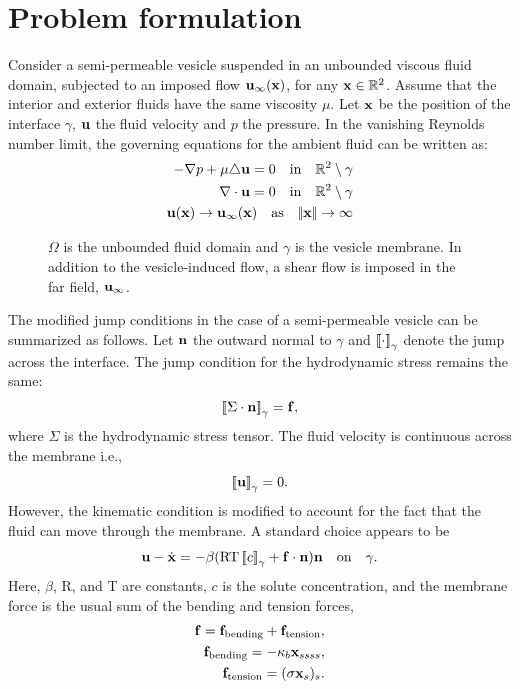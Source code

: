 \documentclass[twoside,twocolumn,9pt]{article}
\begin{document}
\section{Problem formulation} \label{sc:formulate}
Consider a semi-permeable vesicle suspended in an unbounded viscous
fluid domain, subjected to an imposed flow $\mathbf{u}_\infty(\mathbf{x})$, for any
$\mathbf{x} \in \mathbb{R}^2$.  Assume that the interior and exterior fluids have the same viscosity $\mu$. Let $\mathbf{x}$ be the position of the interface $\gamma$, $\mathbf{u}$ the fluid velocity and $p$ the pressure. In the vanishing Reynolds number limit, the governing equations for the ambient fluid can be written as: 
%
\begin{subequations}
\begin{align}
-\nabla p + \mu \triangle \mbu = 0 \quad\text{in}\quad
  \RR^2\setminus\gamma  &  \\
% 
\nabla \cdot \mbu = 0  \quad\text{in}\quad \RR^2\setminus\gamma &\\
%
\mbu(\mbx) \rightarrow \mbu_\infty(\mbx) \quad \text{as} \quad  \norm{\mbx} \rightarrow \infty & 
 \end{align} \label{eqn:governing}
\end{subequations}
\begin{figure}[H]
	\centering
	\caption{$\Omega$ is the unbounded fluid domain and $\gamma$ is the vesicle membrane. In addition to the vesicle-induced flow, a shear flow is imposed in the far field, $\mathbf{u}_\infty$.}
\end{figure}
The modified jump conditions in the case of a semi-permeable vesicle can
be summarized as follows.  Let $\mathbf{n}$ the outward normal to $\gamma$ and
$\left[\!\left[ \cdot \right]\!\right]_\gamma$ denote the jump across the interface. The jump condition
for the hydrodynamic stress remains the same:
\begin{align} 
  \left[\!\left[ \Sigma\cdot\mathbf{n} \right]\!\right]_\gamma = \mathbf{f}, 
\end{align}
where $\Sigma$ is the hydrodynamic stress tensor. The fluid velocity is
continuous across the membrane i.e.,
\begin{align}
  \left[\!\left[ \mathbf{u} \right]\!\right]_\gamma = 0. 
\end{align}
However, the kinematic condition is modified to account for the fact
that the fluid can move through the membrane. A standard choice appears
to be
\begin{align}
  \mathbf{u} - \dot{\mathbf{x}} = - \beta (\text{RT}\left[\!\left[ c \right]\!\right]_\gamma+\mathbf{f} \cdot \mathbf{n}) \mathbf{n}
      \quad\text{on}\quad\gamma. 
\end{align}
Here, $\beta$, R, and T are constants, $c$ is the solute concentration, and the membrane force is the usual sum of the bending and tension forces,
\begin{subequations}
	\begin{align}
	\mathbf{f} = \mathbf{f}_{\text{bending}}+\mathbf{f}_{\text{tension}},  &  \\
	\mathbf{f}_{\text{bending}} = -\kappa_b\mathbf{x}_{ssss}, &\\
	\mathbf{f}_{\text{tension}} = (\sigma\mathbf{x}_s)_s. & 
	\end{align} \label{eqn:bendten}
\end{subequations}
\end{document}
